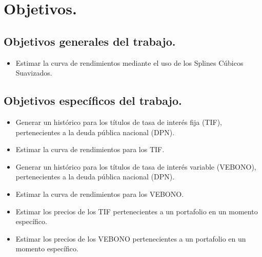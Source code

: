 \section{Objetivos.}

\subsection{Objetivos  generales del trabajo.}

\begin{itemize}
  \item Estimar la curva de rendimientos mediante el uso de los Splines C\'ubicos Suavizados.
\end{itemize}

\subsection{Objetivos espec\'ificos del trabajo.}

\begin{itemize}
  \item Generar un hist\'orico para los t\'itulos de tasa de inter\'es fija (TIF), pertenecientes a la deuda p\'ublica nacional (DPN).
  \item Estimar la curva de rendimientos para los TIF.
  \item Generar un hist\'orico para los t\'itulos de tasa de inter\'es variable (VEBONO), pertenecientes a la deuda p\'ublica nacional (DPN).
  \item Estimar la curva de rendimientos para los VEBONO.
  \item Estimar los precios de los TIF pertenecientes a un portafolio en un momento espec\'ifico.
  \item Estimar los precios de los VEBONO pertenecientes a un portafolio en un momento espec\'ifico.

\end{itemize}



